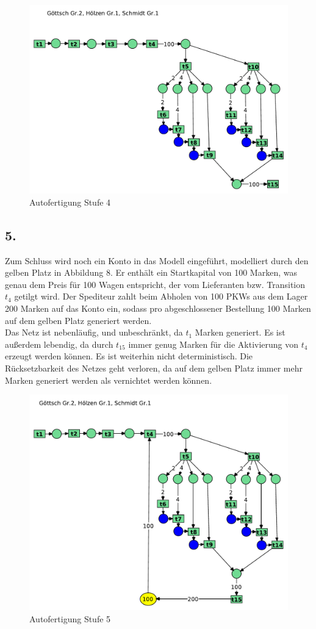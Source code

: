 \documentclass[12pt, paper=a4]{article}
\begin{document}
\begin{figure}[h!]
\centering
\includegraphics[scale=0.7]{7-5-4.pdf}
\caption{Autofertigung Stufe 4}
\end{figure}

\newpage
\subsection*{5.}
Zum Schluss wird noch ein Konto in das Modell eingeführt, modelliert durch den gelben Platz in Abbildung 8. Er enthält ein Startkapital von 100 Marken, was genau dem Preis für 100 Wagen entspricht, der vom Lieferanten bzw. Transition $t_4$ getilgt wird. Der Spediteur zahlt beim Abholen von 100 PKWs aus dem Lager 200 Marken auf das Konto ein, sodass pro abgeschlossener Bestellung 100 Marken auf dem gelben Platz generiert werden.\\

Das Netz ist nebenläufig, und unbeschränkt, da $t_1$ Marken generiert. Es ist außerdem lebendig, da durch $t_15$ immer genug Marken für die Aktivierung von $t_4$ erzeugt werden können. Es ist weiterhin nicht deterministisch. Die Rücksetzbarkeit des Netzes geht verloren, da auf dem gelben Platz immer mehr Marken generiert werden als vernichtet werden können.\\

\begin{figure}[h!]
\centering
\includegraphics[scale=0.7]{7-5-5.pdf}
\caption{Autofertigung Stufe 5}
\end{figure}
\end{document}
